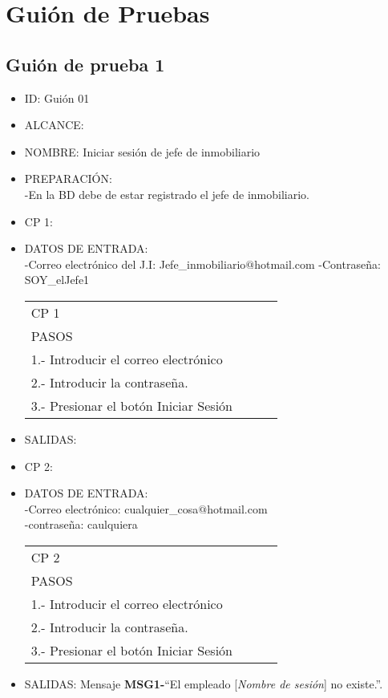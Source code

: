 \section{Guión de Pruebas}

\subsection{Guión de prueba 1}
\begin{itemize}
\item ID: Guión 01
\item ALCANCE: 
\item NOMBRE: Iniciar sesión de jefe de inmobiliario  
\item PREPARACIÓN:\\
-En la BD debe de estar registrado el jefe de inmobiliario.
\item CP 1:
\item DATOS DE ENTRADA:\\
	-Correo electrónico del J.I: Jefe\_inmobiliario$@$hotmail.com
	-Contraseña: SOY\_elJefe1
\begin{center}			
	\begin{tabular}{|l|l|l|l|}
		\hline
		CP 1\\
		PASOS\\
		\hline 1.- Introducir el correo electrónico\\
		\hline 2.- Introducir la contraseña.\\
		\hline 3.- Presionar el botón Iniciar Sesión\\
		\hline
	\end{tabular}
\end{center}
\item SALIDAS: \label{CU1LoginJI}
\item CP 2:
\item DATOS DE ENTRADA:\\
	-Correo electrónico: cualquier\_cosa$@$hotmail.com\\
	-contraseña: caulquiera
\begin{center}			
	\begin{tabular}{|l|l|l|l|}
		\hline
		CP 2\\
		PASOS\\
		\hline 1.- Introducir el correo electrónico\\
		\hline 2.- Introducir la contraseña.\\
		\hline 3.- Presionar el botón Iniciar Sesión\\
		\hline
	\end{tabular}
\end{center}
\item SALIDAS: Mensaje {\bf MSG1-}``El empleado [{\em Nombre de sesión}] no existe.''.
  

\end{itemize}
